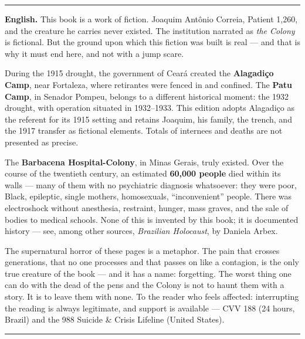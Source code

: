 \vspace{1.2em}
\noindent\rule{\textwidth}{0.5pt}
\vspace{0.8em}

\noindent\textbf{English.} This book is a work of fiction. Joaquim Antônio Correia, Patient 1,260, and the creature he carries never existed. The institution narrated as \textit{the Colony} is fictional. But the ground upon which this fiction was built is real --- and that is why it must end here, and not with a jump scare.

\vspace{0.6em}
\noindent During the 1915 drought, the government of Ceará created the \textbf{Alagadiço Camp}, near Fortaleza, where retirantes were fenced in and confined. The \textbf{Patu Camp}, in Senador Pompeu, belongs to a different historical moment: the 1932 drought, with operation situated in 1932--1933. This edition adopts Alagadiço as the referent for its 1915 setting and retains Joaquim, his family, the trench, and the 1917 transfer as fictional elements. Totals of internees and deaths are not presented as precise.

\vspace{0.6em}
\noindent The \textbf{Barbacena Hospital-Colony}, in Minas Gerais, truly existed. Over the course of the twentieth century, an estimated \textbf{60,000 people} died within its walls --- many of them with no psychiatric diagnosis whatsoever: they were poor, Black, epileptic, single mothers, homosexuals, ``inconvenient'' people. There was electroshock without anesthesia, restraint, hunger, mass graves, and the sale of bodies to medical schools. None of this is invented by this book; it is documented history --- see, among other sources, \textit{Brazilian Holocaust}, by Daniela Arbex.

\vspace{0.6em}
\noindent The supernatural horror of these pages is a metaphor. The pain that crosses generations, that no one processes and that passes on like a contagion, is the only true creature of the book --- and it has a name: forgetting. The worst thing one can do with the dead of the pens and the Colony is not to haunt them with a story. It is to leave them with none. To the reader who feels affected: interrupting the reading is always legitimate, and support is available --- CVV 188 (24 hours, Brazil) and the 988 Suicide \& Crisis Lifeline (United States).

\vspace{1.2em}
\noindent\rule{\textwidth}{0.5pt}
\vspace{0.8em}

